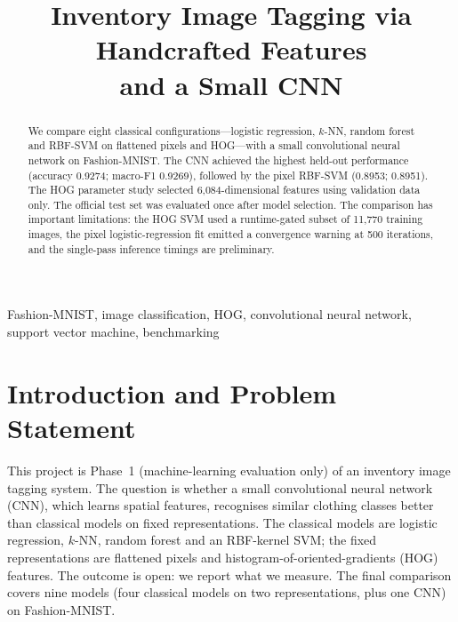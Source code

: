 \documentclass[conference]{IEEEtran}
\begin{document}
\title{Inventory Image Tagging via Handcrafted Features\\and a Small CNN}

\author{
}

\maketitle

\begin{abstract}
We compare eight classical configurations—logistic regression, $k$-NN, random forest and RBF-SVM on flattened pixels and HOG—with a small convolutional neural network on Fashion-MNIST. The CNN achieved the highest held-out performance (accuracy 0.9274; macro-F1 0.9269), followed by the pixel RBF-SVM (0.8953; 0.8951). The HOG parameter study selected 6,084-dimensional features using validation data only. The official test set was evaluated once after model selection. The comparison has important limitations: the HOG SVM used a runtime-gated subset of 11,770 training images, the pixel logistic-regression fit emitted a convergence warning at 500 iterations, and the single-pass inference timings are preliminary.
\end{abstract}

\begin{IEEEkeywords}
Fashion-MNIST, image classification, HOG, convolutional neural network, support vector machine, benchmarking
\end{IEEEkeywords}

\section{Introduction and Problem Statement}
\label{sec:intro}
This project is Phase~1 (machine-learning evaluation only) of an inventory image tagging system.
The question is whether a small convolutional neural network (CNN), which learns spatial features, recognises similar
clothing classes better than classical models on fixed representations. The classical models are logistic
regression, $k$-NN, random forest and an RBF-kernel SVM; the fixed representations are flattened pixels and
histogram-of-oriented-gradients (HOG) features. The outcome is open: we report what we measure. The final
comparison covers nine models (four classical models on two representations, plus one CNN) on Fashion-MNIST.


\end{document}

